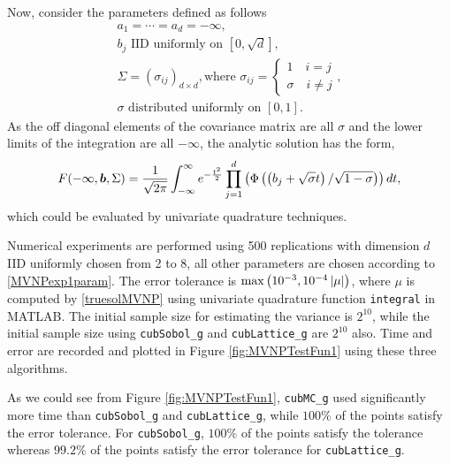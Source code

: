 \documentclass{iitthesis}
\theoremstyle{definition}
\begin{document}
Now, consider the parameters defined as follows 
\begin{subequations} \label{MVNPexp1param}
\begin{gather}
a_1=\cdots=a_d =-\infty,\\
b_j \text{ IID uniformly on } [0,\sqrt{d}],\\
\Sigma = (\sigma_{ij})_{d\times d}, \text{where } \sigma_{ij} =  
  \begin{cases}1 \quad i=j \\
   \sigma \quad i \neq j 
  \end{cases},\\
\sigma \text{ distributed uniformly on } [0,1].
\end{gather}
\end{subequations}
As the off diagonal elements of the covariance matrix are all $\sigma$ and the lower limits of the integration are all $-\infty$, the analytic solution has the form,
\begin{align}\label{truesolMVNP}
F(-\infty, \boldsymbol{b},\Sigma) = \frac{1}{\sqrt{2\pi}}\int_{-\infty}^{\infty} e^{-\frac{t^2}{2}} \prod_{j=1}^d \left(\Phi\left(\left(b_j+\sqrt{\sigma}t\right)/\sqrt{1-\sigma}\right)\right)dt,
\end{align}
which could be evaluated by univariate quadrature techniques.

Numerical experiments are performed using 500 replications with dimension $d$ IID uniformly chosen from 2 to 8, all other parameters are chosen according to \eqref{MVNPexp1param}. The error tolerance is $\max\left(10^{-3},10^{-4} \left \lvert \mu \right \rvert\right)$, where $\mu$ is computed by \eqref{truesolMVNP} using univariate quadrature function {\tt integral} in MATLAB. The initial sample size for estimating the variance is $2^{10}$, while the initial sample size using {\tt cubSobol\_g} and {\tt cubLattice\_g} are $2^{10}$ also. Time and error are recorded and plotted in Figure \ref{fig:MVNPTestFun1} using these three algorithms.

As we could see from Figure \ref{fig:MVNPTestFun1}, {\tt cubMC\_g} used significantly more time than {\tt cubSobol\_g} and {\tt cubLattice\_g}, while $100\%$ of the points satisfy the error tolerance. For {\tt cubSobol\_g}, $100\%$ of the points satisfy the tolerance whereas $99.2\%$ of the points satisfy the error tolerance for {\tt cubLattice\_g}.

\end{document}
